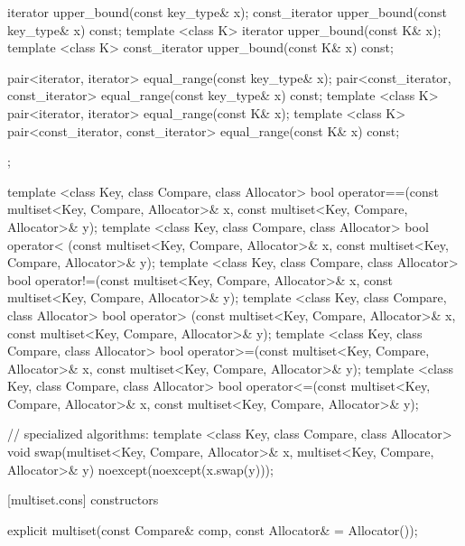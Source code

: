 \begin{codeblock}
{{    iterator       upper_bound(const key_type& x);
    const_iterator upper_bound(const key_type& x) const;
    template <class K> iterator       upper_bound(const K& x);
    template <class K> const_iterator upper_bound(const K& x) const;

    pair<iterator, iterator>               equal_range(const key_type& x);
    pair<const_iterator, const_iterator>   equal_range(const key_type& x) const;
    template <class K>
      pair<iterator, iterator>             equal_range(const K& x);
    template <class K>
      pair<const_iterator, const_iterator> equal_range(const K& x) const;
  };

  template <class Key, class Compare, class Allocator>
    bool operator==(const multiset<Key, Compare, Allocator>& x,
                    const multiset<Key, Compare, Allocator>& y);
  template <class Key, class Compare, class Allocator>
    bool operator< (const multiset<Key, Compare, Allocator>& x,
                    const multiset<Key, Compare, Allocator>& y);
  template <class Key, class Compare, class Allocator>
    bool operator!=(const multiset<Key, Compare, Allocator>& x,
                    const multiset<Key, Compare, Allocator>& y);
  template <class Key, class Compare, class Allocator>
    bool operator> (const multiset<Key, Compare, Allocator>& x,
                    const multiset<Key, Compare, Allocator>& y);
  template <class Key, class Compare, class Allocator>
    bool operator>=(const multiset<Key, Compare, Allocator>& x,
                    const multiset<Key, Compare, Allocator>& y);
  template <class Key, class Compare, class Allocator>
    bool operator<=(const multiset<Key, Compare, Allocator>& x,
                    const multiset<Key, Compare, Allocator>& y);

  // specialized algorithms:
  template <class Key, class Compare, class Allocator>
    void swap(multiset<Key, Compare, Allocator>& x,
              multiset<Key, Compare, Allocator>& y)
      noexcept(noexcept(x.swap(y)));
}
\end{codeblock}%
%

[multiset.cons]{ constructors}

%
%
\begin{itemdecl}
explicit multiset(const Compare& comp, const Allocator& = Allocator());
\end{itemdecl}


